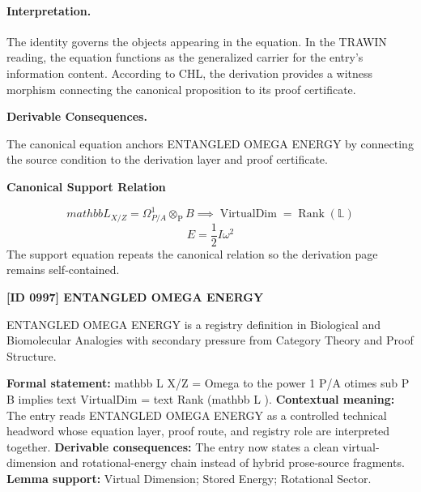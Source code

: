 \paragraph{Interpretation.}
The identity governs the objects appearing in the equation. In the TRAWIN reading, the equation functions as the generalized carrier for the entry’s information content. According to CHL, the derivation provides a witness morphism connecting the canonical proposition to its proof certificate.

\par\vspace{0.35em}
\noindent\textbf{Derivable Consequences.}\quad
\begingroup
\footnotesize
\raggedright
The canonical equation anchors ENTANGLED OMEGA ENERGY by connecting the source condition to the derivation layer and proof certificate.
\par\endgroup

\noindent\textbf{Canonical Support Relation}\par
\[
mathbb{L}_{X/Z}=\Omega^{1}_{P/A}\otimes_{\mathrm{P}} B \implies \operatorname{VirtualDim}=\operatorname{Rank}(\mathbb{L})
\]
\[
E=\frac{1}{2}I\omega^{2}
\]
\noindent The support equation repeats the canonical relation so the derivation page remains self-contained.\par

\clearpage
\noindent\textbf{[ID 0997] ENTANGLED OMEGA ENERGY}\par
\vspace{0.35em}
\begingroup\small
{}
ENTANGLED OMEGA ENERGY is a registry definition in Biological and Biomolecular Analogies with secondary pressure from Category Theory and Proof Structure.

\begingroup\footnotesize\setlength{\emergencystretch}{3em}\sloppy
\textbf{Formal statement:} mathbb L X/Z = Omega to the power 1 P/A otimes sub P B implies text VirtualDim = text Rank (mathbb L ). \textbf{Contextual meaning:} The entry reads ENTANGLED OMEGA ENERGY as a controlled technical headword whose equation layer, proof route, and registry role are interpreted together. \textbf{Derivable consequences:} The entry now states a clean virtual-dimension and rotational-energy chain instead of hybrid prose-source fragments. \textbf{Lemma support:} Virtual Dimension; Stored Energy; Rotational Sector.\par
\endgroup


